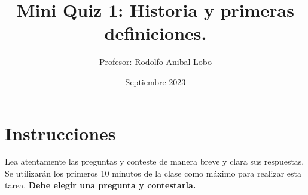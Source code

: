 \documentclass{exam}
\title{Mini Quiz 1: Historia y primeras definiciones.}
\author{Profesor: Rodolfo Anibal Lobo}
\date{Septiembre 2023}
\theoremstyle{definition}
\begin{document}
\maketitle



\section*{Instrucciones}
\thispagestyle{empty}
Lea atentamente las preguntas y conteste de manera breve y clara sus respuestas. Se utilizarán los primeros 10 minutos de la clase como máximo para realizar esta tarea. \textbf{Debe elegir una pregunta y contestarla.}
\end{document}
